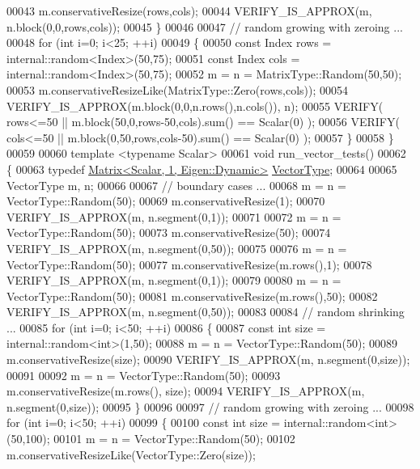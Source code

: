 \begin{DoxyCode}
00043     m.conservativeResize(rows,cols);
00044     VERIFY\_IS\_APPROX(m, n.block(0,0,rows,cols));
00045   \}
00046 
00047   \textcolor{comment}{// random growing with zeroing ...}
00048   \textcolor{keywordflow}{for} (\textcolor{keywordtype}{int} i=0; i<25; ++i)
00049   \{
00050     \textcolor{keyword}{const} Index rows = internal::random<Index>(50,75);
00051     \textcolor{keyword}{const} Index cols = internal::random<Index>(50,75);
00052     m = n = MatrixType::Random(50,50);
00053     m.conservativeResizeLike(MatrixType::Zero(rows,cols));
00054     VERIFY\_IS\_APPROX(m.block(0,0,n.rows(),n.cols()), n);
00055     VERIFY( rows<=50 || m.block(50,0,rows-50,cols).sum() == Scalar(0) );
00056     VERIFY( cols<=50 || m.block(0,50,rows,cols-50).sum() == Scalar(0) );
00057   \}
00058 \}
00059 
00060 \textcolor{keyword}{template} <\textcolor{keyword}{typename} Scalar>
00061 \textcolor{keywordtype}{void} run\_vector\_tests()
00062 \{
00063   \textcolor{keyword}{typedef} \hyperlink{group___core___module_class_eigen_1_1_matrix}{Matrix<Scalar, 1, Eigen::Dynamic>} 
      \hyperlink{struct_vector_type}{VectorType};
00064 
00065   VectorType m, n;
00066 
00067   \textcolor{comment}{// boundary cases ...}
00068   m = n = VectorType::Random(50);
00069   m.conservativeResize(1);
00070   VERIFY\_IS\_APPROX(m, n.segment(0,1));
00071 
00072   m = n = VectorType::Random(50);
00073   m.conservativeResize(50);
00074   VERIFY\_IS\_APPROX(m, n.segment(0,50));
00075   
00076   m = n = VectorType::Random(50);
00077   m.conservativeResize(m.rows(),1);
00078   VERIFY\_IS\_APPROX(m, n.segment(0,1));
00079 
00080   m = n = VectorType::Random(50);
00081   m.conservativeResize(m.rows(),50);
00082   VERIFY\_IS\_APPROX(m, n.segment(0,50));
00083 
00084   \textcolor{comment}{// random shrinking ...}
00085   \textcolor{keywordflow}{for} (\textcolor{keywordtype}{int} i=0; i<50; ++i)
00086   \{
00087     \textcolor{keyword}{const} \textcolor{keywordtype}{int} size = internal::random<int>(1,50);
00088     m = n = VectorType::Random(50);
00089     m.conservativeResize(size);
00090     VERIFY\_IS\_APPROX(m, n.segment(0,size));
00091     
00092     m = n = VectorType::Random(50);
00093     m.conservativeResize(m.rows(), size);
00094     VERIFY\_IS\_APPROX(m, n.segment(0,size));
00095   \}
00096 
00097   \textcolor{comment}{// random growing with zeroing ...}
00098   \textcolor{keywordflow}{for} (\textcolor{keywordtype}{int} i=0; i<50; ++i)
00099   \{
00100     \textcolor{keyword}{const} \textcolor{keywordtype}{int} size = internal::random<int>(50,100);
00101     m = n = VectorType::Random(50);
00102     m.conservativeResizeLike(VectorType::Zero(size));

\end{DoxyCode}
